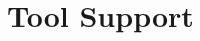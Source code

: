%
%
%
%
%
%
%
%
%
%

\newcommand{\ompttype}[1]{\subsubsection{#1}}  %
\newcommand{\omptcallbacksignature}[1]{\subsubsection{#1}}  %
\newcommand{\omptruntimeentrypoint}[1]{\subsubsection{#1}}  %
\newcommand{\ompteventswithoutdirectives}[1]{\littleheader{#1}}

\chapter{Tool Support}
\label{chap:ToolsSupport}

